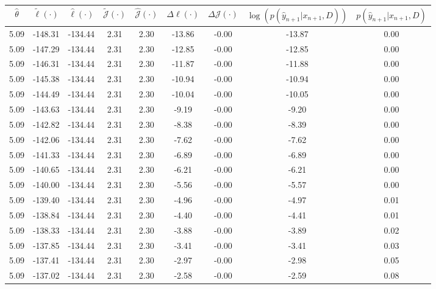 \begin{table}[htbp]
        \centering
        \tiny
        \begin{adjustbox}{angle=90}
            \begin{tabular}{|c|c|c|c|c|c|c|c|c|}
                \hline
                 $\hat{\theta}$ & $\tilde{\ell}(\cdot)$ & $\hat{\ell}(\cdot)$ & $\tilde{\mathcal{J}}(\cdot)$ & $\hat{\mathcal{J}}(\cdot)$ & $\Delta \ell(\cdot)$ & $\Delta \mathcal{J}(\cdot)$ & $\log(p(\hat{y}_{n+1}|x_{n+1}, D))$ & $p(\hat{y}_{n+1}|x_{n+1}, D)$ \\
                \hline
                 5.09 & -148.31 & -134.44 & 2.31 & 2.30 & -13.86 & -0.00 & -13.87 & 0.00\\ \hline
 5.09 & -147.29 & -134.44 & 2.31 & 2.30 & -12.85 & -0.00 & -12.85 & 0.00\\ \hline
 5.09 & -146.31 & -134.44 & 2.31 & 2.30 & -11.87 & -0.00 & -11.88 & 0.00\\ \hline
 5.09 & -145.38 & -134.44 & 2.31 & 2.30 & -10.94 & -0.00 & -10.94 & 0.00\\ \hline
 5.09 & -144.49 & -134.44 & 2.31 & 2.30 & -10.04 & -0.00 & -10.05 & 0.00\\ \hline
 5.09 & -143.63 & -134.44 & 2.31 & 2.30 & -9.19 & -0.00 & -9.20 & 0.00\\ \hline
 5.09 & -142.82 & -134.44 & 2.31 & 2.30 & -8.38 & -0.00 & -8.39 & 0.00\\ \hline
 5.09 & -142.06 & -134.44 & 2.31 & 2.30 & -7.62 & -0.00 & -7.62 & 0.00\\ \hline
 5.09 & -141.33 & -134.44 & 2.31 & 2.30 & -6.89 & -0.00 & -6.89 & 0.00\\ \hline
 5.09 & -140.65 & -134.44 & 2.31 & 2.30 & -6.21 & -0.00 & -6.21 & 0.00\\ \hline
 5.09 & -140.00 & -134.44 & 2.31 & 2.30 & -5.56 & -0.00 & -5.57 & 0.00\\ \hline
 5.09 & -139.40 & -134.44 & 2.31 & 2.30 & -4.96 & -0.00 & -4.97 & 0.01\\ \hline
 5.09 & -138.84 & -134.44 & 2.31 & 2.30 & -4.40 & -0.00 & -4.41 & 0.01\\ \hline
 5.09 & -138.33 & -134.44 & 2.31 & 2.30 & -3.88 & -0.00 & -3.89 & 0.02\\ \hline
 5.09 & -137.85 & -134.44 & 2.31 & 2.30 & -3.41 & -0.00 & -3.41 & 0.03\\ \hline
 5.09 & -137.41 & -134.44 & 2.31 & 2.30 & -2.97 & -0.00 & -2.98 & 0.05\\ \hline
 5.09 & -137.02 & -134.44 & 2.31 & 2.30 & -2.58 & -0.00 & -2.59 & 0.08\\ \hline

\end{tabular}
\end{adjustbox}
\end{table}
